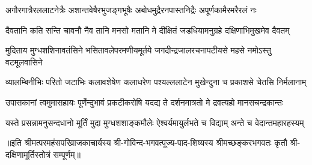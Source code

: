 \begin{AutoCols}[\maxColumns]
\fourlineindentedshloka
{अगौरगात्रैरललाटनेत्रैः}
{अशान्तवेषैरभुजङ्गभूषैः}
{अबोधमुद्रैरनपास्तनिद्रैः}
{अपूर्णकामैरमरैरलं नः}

\fourlineindentedshloka
{दैवतानि कति सन्ति चावनौ}
{नैव तानि मनसो मतानि मे}
{दीक्षितं जडधियामनुग्रहे}
{दक्षिणाभिमुखमेव दैवतम्}

\fourlineindentedshloka
{मुदिताय मुग्धशशिनावतंसिने}
{भसितावलेपरमणीयमूर्तये}
{जगदीन्द्रजालरचनापटीयसे}
{महसे नमोऽस्तु वटमूलवासिने}

\fourlineindentedshloka
{व्यालम्बिनीभिः परितो जटाभिः}
{कलावशेषेण कलाधरेण}
{पश्यल्ललाटेन मुखेन्दुना च}
{प्रकाशसे चेतसि निर्मलानाम्}

\fourlineindentedshloka
{उपासकानां त्वमुमासहायः}
{पूर्णेन्दुभावं प्रकटीकरोषि}
{यदद्य ते दर्शनमात्रतो मे}
{द्रवत्यहो मानसचन्द्रकान्तः}

\fourlineindentedshloka
{यस्ते प्रसन्नामनुसन्दधानो}
{मूर्तिं मुदा मुग्धशशाङ्कमौलेः}
{ऐश्वर्यमायुर्लभते च विद्याम्}
{अन्ते च वेदान्तमहारहस्यम्}
\end{AutoCols}

॥इति श्रीमत्परमहंसपरिव्राजकाचार्यस्य श्री-गोविन्द-भगवत्पूज्य-पाद-शिष्यस्य
श्रीमच्छङ्करभगवतः कृतौ श्री-दक्षिणामूर्तिस्तोत्रं सम्पूर्णम्॥